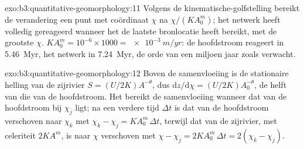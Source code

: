 \begin{solution}{exo:b3:quantitative-geomorphology:11}
Volgens de kinematische-golfstelling bereikt de verandering een punt met
coördinaat $\chi$ na $\chi/(KA_0^m)$; het netwerk heeft volledig gereageerd wanneer het
de laatste bronlocatie heeft bereikt, met de grootste $\chi$. $K A_0^m = 10^{-6}\times
1000 = \qty{e-3}{m/yr}$: de hoofdstroom reageert in \qty{5.46}{Myr}, het netwerk
in \qty{7.24}{Myr}, de orde van een miljoen jaar zoals verwacht.
\end{solution}

\begin{solution}{exo:b3:quantitative-geomorphology:12}
Boven de samenvloeiing is de stationaire helling van de zijrivier $S = (U/2K)A^{-\theta}$,
dus $\mathrm{d}z/\mathrm{d}\chi = (U/2K)A_0^{-\theta}$, de helft van die van de hoofdstroom.
Het  bereikt de samenvloeiing wanneer dat van de hoofdstroom bij $\chi_j$ ligt; na een
verdere tijd $\Delta t$ is dat van de hoofdstroom verschoven naar $\chi_k$ met $\chi_k -
\chi_j = K A_0^m\,\Delta t$, terwijl dat van de zijrivier, met celeriteit $2KA^m$,
is naar $\chi$ verschoven met $\chi - \chi_j = 2KA_0^m\,\Delta t = 2(\chi_k -
\chi_j)$.
\end{solution}


